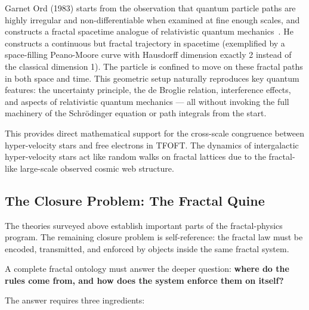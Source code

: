 \documentclass[11pt,a4paper]{article}
\begin{document}
Garnet Ord (1983) starts from the observation that quantum particle paths are highly irregular and non-differentiable when examined at fine enough scales, and constructs a fractal spacetime analogue of relativistic quantum mechanics~\cite{Ord1983}. He constructs a continuous but fractal trajectory in spacetime (exemplified by a space-filling Peano-Moore curve with Hausdorff dimension exactly 2 instead of the classical dimension 1). The particle is confined to move on these fractal paths in both space and time. This geometric setup naturally reproduces key quantum features: the uncertainty principle, the de Broglie relation, interference effects, and aspects of relativistic quantum mechanics --- all without invoking the full machinery of the Schrödinger equation or path integrals from the start.

This provides direct mathematical support for the cross-scale congruence between hyper-velocity stars and free electrons in TFOFT. The dynamics of intergalactic hyper-velocity stars act like random walks on fractal lattices due to the fractal-like large-scale observed cosmic web structure. 

\subsection{The Closure Problem: The Fractal Quine}

The theories surveyed above establish important parts of the fractal-physics program. The remaining closure problem is self-reference: the fractal law must be encoded, transmitted, and enforced by objects inside the same fractal system.

A complete fractal ontology must answer the deeper question: \textbf{where do the rules come from, and how does the system enforce them on itself?}

The answer requires three ingredients:
\end{document}
